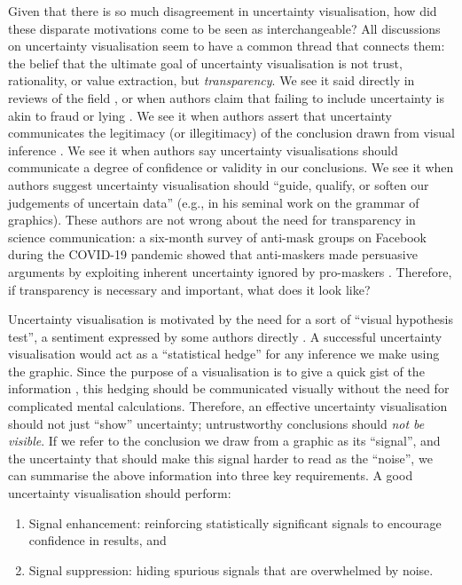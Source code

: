 \documentclass[]{ar-1col-S2O}
\providecommand{\tightlist}{%
  \setlength{\itemsep}{0pt}\setlength{\parskip}{0pt}}\usepackage{longtable,booktabs,array}
\begin{document}
Given that there is so much disagreement in uncertainty visualisation,
how did these disparate motivations come to be seen as interchangeable?
All discussions on uncertainty visualisation seem to have a common
thread that connects them: the belief that the ultimate goal of
uncertainty visualisation is not trust, rationality, or value
extraction, but \emph{transparency}. We see it said directly in reviews
of the field \citep{uncertchap2022}, or when authors claim that failing
to include uncertainty is akin to fraud or lying
\citep{Hullman2020a, Manski2020}. We see it when authors assert that
uncertainty communicates the legitimacy (or illegitimacy) of the
conclusion drawn from visual inference \citep{Kale2018, Griethe2006}. We
see it when authors say uncertainty visualisations should communicate a
degree of confidence \citep{Correll2018, Boukhelifa2012} or validity
\citep{Hullman2020a, Griethe2006} in our conclusions. We see it when
authors suggest uncertainty visualisation should ``guide, qualify, or
soften our judgements of uncertain data'' (e.g., \citet{Leland2005} in
his seminal work on the grammar of graphics). These authors are not
wrong about the need for transparency in science communication: a
six-month survey of anti-mask groups on Facebook during the COVID-19
pandemic showed that anti-maskers made persuasive arguments by
exploiting inherent uncertainty ignored by pro-maskers \citep{Lee2021}.
Therefore, if transparency is necessary and important, what does it look
like?

Uncertainty visualisation is motivated by the need for a sort of
``visual hypothesis test'', a sentiment expressed by some authors
directly \citep{Correll2014, MacEachren1992}. A successful uncertainty
visualisation would act as a ``statistical hedge'' for any inference we
make using the graphic. Since the purpose of a visualisation is to give
a quick gist of the information \citep{Spiegelhalter2017}, this hedging
should be communicated visually without the need for complicated mental
calculations. Therefore, an effective uncertainty visualisation should
not just ``show'' uncertainty; untrustworthy conclusions should
\emph{not be visible}. If we refer to the conclusion we draw from a
graphic as its ``signal'', and the uncertainty that should make this
signal harder to read as the ``noise'', we can summarise the above
information into three key requirements. A good uncertainty
visualisation should perform:

\begin{enumerate}
\def\labelenumi{\arabic{enumi})}
\tightlist
\item
  Signal enhancement: reinforcing statistically significant signals to
  encourage confidence in results, and
\item
  Signal suppression: hiding spurious signals that are overwhelmed by
  noise.
\end{enumerate}
\end{document}

